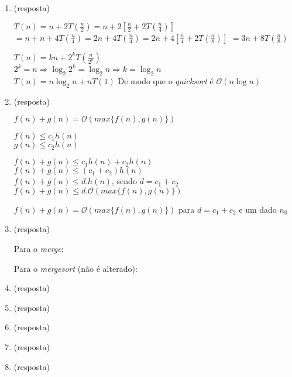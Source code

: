 \documentclass[12pt, a4paper]{article}
\begin{document}
\begin{enumerate}
\item (resposta)

$T(n)=n+2T(\frac{n}{2})=n+2[\frac{n}{2}+2T(\frac{n}{4})]$
$=n+n+4T(\frac{n}{4})=2n+4T(\frac{n}{4})=2n+4[\frac{n}{4}+2T(\frac{n}{8})]$
$=3n+8T(\frac{n}{8})$

$T(n)=kn+2^{k}T(\frac{n}{2^{k}})$\\
$2^{k}=n \Rightarrow \log_{2}2^{k}=\log_{2}n \Rightarrow k=\log_{2}n$\\
$T(n)=n\log_{2}n + nT(1)$
De modo que o \textit{quicksort} é $\mathcal{O}(n\log n)$

\item (resposta)

$f(n)+g(n)=\mathcal{O}(max\{f(n),g(n)\})$

$f(n) \leq c_{1}h(n)$\\
$g(n) \leq c_{2}h(n)$

$f(n)+g(n) \leq c_{1}h(n)+c_{2}h(n)$\\
$f(n)+g(n) \leq (c_{1}+c_{2})h(n)$\\
$f(n)+g(n) \leq d.h(n)$, sendo $d = c_{1}+c_{2}$\\
$f(n)+g(n) \leq d.\mathcal{O}(max\{f(n),g(n)\})$

$f(n)+g(n)=\mathcal{O}(max\{f(n),g(n)\})$ para $d = c_{1}+c_{2}$ e um dado $n_{0}$

\item (resposta)

Para o \textit{merge}:


Para o \textit{mergesort} (não é alterado):


\item (resposta)


\item (resposta)


\item (resposta)


\item (resposta)


\item (resposta)




\end{enumerate}
\end{document}
